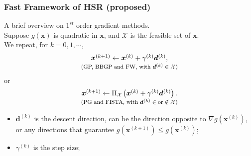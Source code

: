 \documentclass[10pt,mathserif]{beamer}
\newcommand{\iter}[1]{^{(#1)}}
\begin{document}
    \begin{frame}
        \frametitle{Fast Framework of HSR (proposed)}
        A brief overview on $1^{st}$ order gradient methods. \\
        Suppose $g(\bm x)$ is quadratic in $\bm x$, and $\mathcal X$ is the
        feasible set of $\bm x$. \\
        We repeat, for $k = 0,1,\cdots$,
        \begin{equation}
            \begin{array}{c}
                \bm x\iter{k+1} \gets \bm x\iter{k} + \gamma\iter{k} \bm d\iter{k}, \\
                \text{\footnotesize  (GP, BBGP and FW, with $\bm d\iter{k} \in \mathcal X$)}
            \end{array}
            \label{eq:FOGM_Upd_GPFW}
        \end{equation}
        or
        \begin{equation}
            \begin{array}{c}
                \bm x\iter{k+1} \gets \Pi_{\mathcal X}\left( \bm x\iter{k} + \gamma\iter{k} \bm d\iter{k} \right). \\
                \text{\footnotesize  (PG and FISTA, with $\bm d\iter{k} \in \text{or} \notin \mathcal X$)}
            \end{array}
            \label{eq:FOGM_Upd_PG}
        \end{equation}
        \begin{itemize}
            \item $\bm d\iter{k}$ is the descent direction,
                  can be the direction opposite to $\nabla g(\bm x\iter{k})$,
                  or any directions that guarantee $g(\bm x\iter{k+1}) \leq g(\bm x\iter{k})$;
            \item $\gamma\iter{k}$ is the step size;
        \end{itemize}
    \end{frame}
\end{document}
